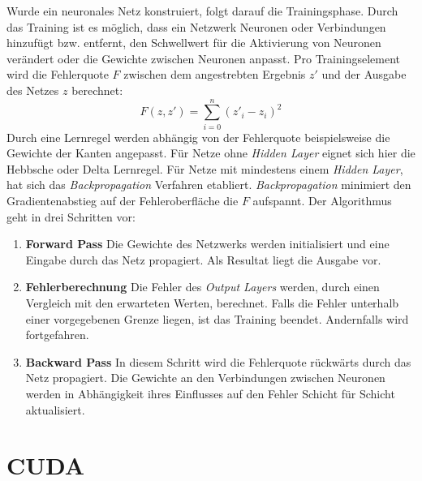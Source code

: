 Wurde ein neuronales Netz konstruiert, folgt darauf die Trainingsphase. Durch das Training ist es möglich, dass ein Netzwerk Neuronen oder Verbindungen hinzufügt bzw. entfernt, den Schwellwert für die Aktivierung von Neuronen verändert oder die Gewichte zwischen Neuronen anpasst. Pro Trainingselement wird die Fehlerquote $F$ zwischen dem angestrebten Ergebnis $z'$ und der Ausgabe des Netzes $z$ berechnet:
$$ F(z, z')=\sum_{i=0}^{n}(z'_{i} - z_{i})^2 $$
Durch eine Lernregel werden abhängig von der Fehlerquote beispielsweise die Gewichte der Kanten angepasst. Für Netze ohne \textit{Hidden Layer} eignet sich hier die Hebbsche oder Delta Lernregel. Für Netze mit mindestens einem \textit{Hidden Layer}, hat sich das \textit{Backpropagation} Verfahren etabliert. \textit{Backpropagation} minimiert den Gradientenabstieg auf der Fehleroberfläche die $F$ aufspannt. Der Algorithmus geht in drei Schritten vor:

\begin{enumerate}
	\item \textbf{Forward Pass} Die Gewichte des Netzwerks werden initialisiert und eine Eingabe durch das Netz propagiert. Als Resultat liegt die Ausgabe vor.
	\item \textbf{Fehlerberechnung} Die Fehler des \textit{Output Layers} werden, durch einen Vergleich mit den erwarteten Werten, berechnet. Falls die Fehler unterhalb einer vorgegebenen Grenze liegen, ist das Training beendet. Andernfalls wird fortgefahren.
	\item \textbf{Backward Pass} In diesem Schritt wird die Fehlerquote rückwärts durch das Netz propagiert. Die Gewichte an den Verbindungen zwischen Neuronen werden in Abhängigkeit ihres Einflusses auf den Fehler Schicht für Schicht aktualisiert.
\end{enumerate}

\section{CUDA}

